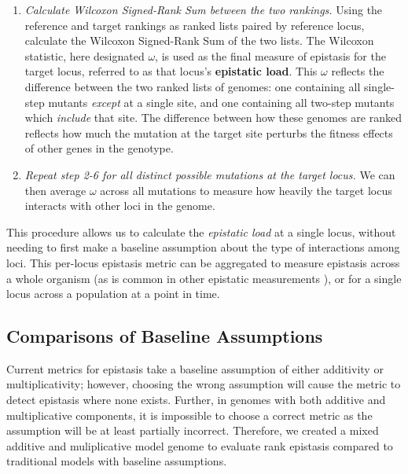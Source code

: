 \begin{enumerate}
\item \textit{Calculate Wilcoxon Signed-Rank Sum between the two rankings.} Using the reference and target rankings as ranked lists paired by reference locus, calculate the Wilcoxon Signed-Rank Sum of the two lists. The Wilcoxon statistic, here designated $\omega$, is used as the final measure of epistasis for the target locus, referred to as that locus's \textbf{epistatic load}. This $\omega$ reflects the difference between the two ranked lists of genomes: one containing all single-step mutants \textit{except} at a single site, and one containing all two-step mutants which \textit{include} that site. The difference between how these genomes are ranked reflects how much the mutation at the target site perturbs the fitness effects of other genes in the genotype.

\item \textit{Repeat step 2-6 for all distinct possible mutations at the target locus.} We can then average $\omega$ across all mutations to measure how heavily the target locus interacts with other loci in the genome.

\end{enumerate}

This procedure allows us to calculate the \textit{epistatic load} at a single locus, without needing to first make a baseline assumption about the type of interactions among loci.  
This per-locus epistasis metric can be aggregated to measure epistasis across a whole organism (as is common in other epistatic measurements \citep{elena_test_1997, franklin_mapping_2019}), or for a single locus across a population at a point in time. 

\subsection{Comparisons of Baseline Assumptions}

Current metrics for epistasis take a baseline assumption of either additivity or multiplicativity; however, choosing the wrong assumption will cause the metric to detect epistasis where none exists. Further, in genomes with both additive and multiplicative components, it is impossible to choose a correct metric as the assumption will be at least partially incorrect. Therefore, we created a mixed additive and muliplicative model genome to evaluate rank epistasis compared to traditional models with baseline assumptions.

